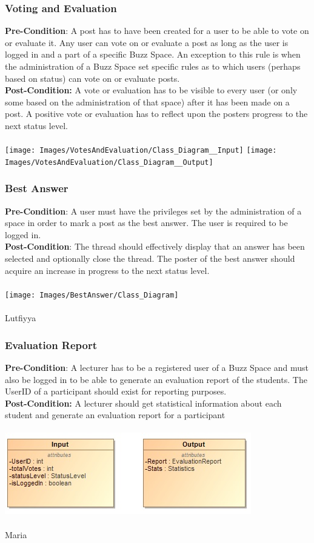 \documentclass[a4paper,11pt]{article}
\begin{document}
\subsubsection{Voting and Evaluation}
\textbf{Pre-Condition}: A post has to have been created for a user to be able to vote on or evaluate it. Any user can vote on or evaluate a post as long as the user is logged in and a part of a specific Buzz Space. An exception to this rule is when the administration of a Buzz Space set specific rules as to which users (perhaps based on status) can vote on or evaluate posts.
\\
\textbf{Post-Condition:} A vote or evaluation has to be visible to every user (or only some based on the administration of that space) after it has been made on a post. A positive vote or evaluation has to reflect upon the posters progress to the next status level.
\\
\\
\texttt{[image: Images/VotesAndEvaluation/Class\_Diagram\_\_Input]}
\texttt{[image: Images/VotesAndEvaluation/Class\_Diagram\_\_Output]}
\\
\subsubsection{Best Answer}
\textbf{Pre-Condition}: A user must have the privileges set by the administration of a space in order to mark a post as the best answer. The user is required to be logged in.
\\
\textbf{Post-Condition}: The thread should effectively display that an answer has been selected and optionally close the thread. The poster of the best answer should acquire an increase in progress to the next status level.
\\
\\
\texttt{[image: Images/BestAnswer/Class\_Diagram]}
\\
\\
Lutfiyya\\
\subsubsection{Evaluation Report}
\textbf{Pre-Condition}: A lecturer has to be a registered user of a Buzz Space and must also be logged in to be able to generate an evaluation report of the students. The UserID of a participant should exist for reporting purposes.
\\
\textbf{Post-Condition:} A lecturer should get statistical information about each student and generate an evaluation report for a participant
\\
\\
\includegraphics{Images/Report/Input&Output}
\\
\\
Maria\\
\end{document}
